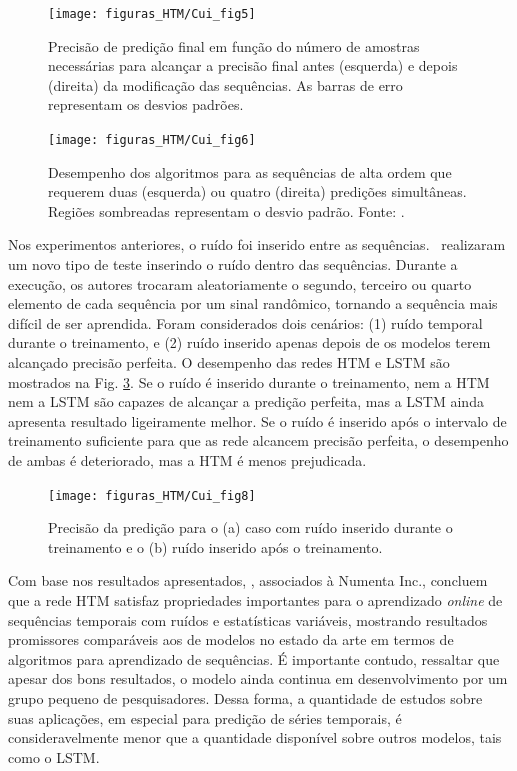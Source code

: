 \begin{figure}[H]
	\centering
	\texttt{[image: figuras\_HTM/Cui\_fig5]}
	\caption{Precisão de predição final em função do número de amostras necessárias para alcançar a precisão final antes (esquerda) e depois (direita) da modificação das sequências. As barras de erro representam os desvios padrões.}
	\label{fig:cuifig5}
\end{figure}

\begin{figure}[H]
	\centering
	\texttt{[image: figuras\_HTM/Cui\_fig6]}
	\caption{Desempenho dos algoritmos para as sequências de alta ordem que requerem duas (esquerda) ou quatro (direita) predições simultâneas. Regiões sombreadas representam o desvio padrão. Fonte: \cui.}
	\label{fig:cuifig6}
\end{figure}

Nos experimentos anteriores, o ruído foi inserido entre as sequências. \cui \ realizaram um novo tipo de teste inserindo o ruído dentro das sequências. Durante a execução, os autores trocaram aleatoriamente o segundo, terceiro ou quarto elemento de cada sequência por um sinal randômico, tornando a sequência mais difícil de ser aprendida. Foram considerados dois cenários: (1) ruído temporal durante o treinamento, e (2) ruído inserido apenas depois de os modelos terem alcançado precisão perfeita. O desempenho das redes HTM e LSTM são mostrados na Fig. \ref{fig:cuifig8}. Se o ruído é inserido durante o treinamento, nem a HTM nem a LSTM são capazes de alcançar a predição perfeita, mas a LSTM ainda apresenta resultado ligeiramente melhor. Se o ruído é inserido após o intervalo de treinamento suficiente para que as rede alcancem precisão perfeita, o desempenho de ambas é deteriorado, mas a HTM é menos prejudicada.

\begin{figure}[H]
	\centering
	\texttt{[image: figuras\_HTM/Cui\_fig8]}
	\caption{Precisão da predição para o (a) caso com ruído inserido durante o treinamento e o (b) ruído inserido após o treinamento. }
	\label{fig:cuifig8}
\end{figure}


Com base nos resultados apresentados, \cui, associados à Numenta Inc., concluem que a rede HTM satisfaz propriedades importantes para o aprendizado \textit{online} de sequências temporais com ruídos e estatísticas variáveis, mostrando resultados promissores comparáveis aos de modelos no estado da arte em termos de algoritmos para aprendizado de sequências. É importante contudo, ressaltar que apesar dos bons resultados,  o modelo ainda continua em desenvolvimento por um grupo pequeno de pesquisadores. Dessa forma, a quantidade de estudos sobre suas aplicações, em especial para predição de séries temporais, é consideravelmente menor que a quantidade disponível sobre outros modelos, tais como o LSTM. 


